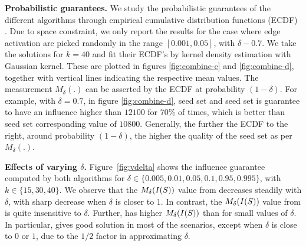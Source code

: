 \noindent
\textbf{Probabilistic guarantees.}
We study the probabilistic guarantees of the different algorithms through empirical cumulative
distribution functions (ECDF) \cite{terrell1992variable}.
Due to space constraint, we only report the results for the case where edge activation are picked randomly in the range $[0.001,0.05]$, with $\delta-0.7$. We take the solutions for $k=40$ and fit their
ECDF's by kernel density estimation with Gaussian kernel.
These are plotted in figures \ref{fig:combine-c} and \ref{fig:combine-d}, together with
vertical lines indicating the respective mean values. The
measurement $M_{\delta}(.)$ can be asserted by the ECDF at probability $(1-\delta)$. For
example, with $\delta=0.7$, in figure \ref{fig:combine-d}, \multicritalgo{} seed set and \infprobheu{} seed set
is guarantee to have an influence higher than $12100$ for $70$\% of times, which is better than
\infmax{} seed set corresponding value of $10800$.
Generally, the further the ECDF to the right, around probability $(1-\delta)$, the higher the
quality of the seed set as per $M_{\delta}(.)$.

\smallskip
\noindent
\textbf{Effects of varying $\delta$.}
Figure~\ref{fig:vdelta} shows the influence guarantee computed by both algorithms for $\delta\in\{0.005, 0.01, 0.05, 0.1, 0.95, 0.995\}$, with $k\in\{15, 30, 40\}$.
We observe that the $\mbox{$M_{\delta}(I(S))$}$ value from \infprobheu{} decreases steadily with $\delta$, with sharp decrease when $\delta$ is closer to $1$. In contrast, the $\mbox{$M_{\delta}(I(S))$}$ value from  \multicritalgo{} is quite insensitive to $\delta$.
Further, \infprobheu{} has higher $\mbox{$M_{\delta}(I(S))$}$ than \multicritalgo{} for small values of $\delta$.
In particular, \multicritalgo{} gives good solution in most of the scenarios, except when $\delta$ is close to $0$ or $1$, due to the $1/2$ factor in approximating $\delta$.


